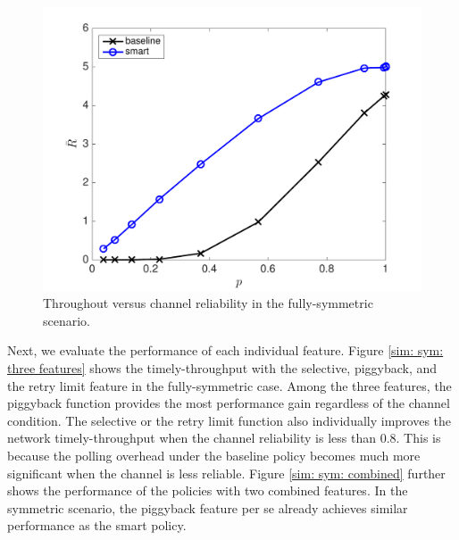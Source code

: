 \documentclass{article}
\begin{document}
\begin{figure}[htbp]
\centering
\includegraphics[scale=0.5]{R_p_sym.pdf}
\caption{Throughout versus channel reliability in the fully-symmetric scenario.}
\label{sim: sym: smart and baseline}
\end{figure}

Next, we evaluate the performance of each individual feature. Figure \ref{sim: sym: three features} shows the timely-throughput with the selective, piggyback, and the retry limit feature in the fully-symmetric case. Among the three features, the piggyback function provides the most performance gain regardless of the channel condition. The selective or the retry limit function also individually improves the network timely-throughput when the channel reliability is less than 0.8. This is because the polling overhead under the baseline policy becomes much more significant when the channel is less reliable. Figure \ref{sim: sym: combined} further shows the performance of the policies with two combined features. In the symmetric scenario, the piggyback feature per se already achieves similar performance as the smart policy.
\end{document}
